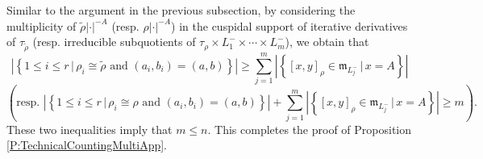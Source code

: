 \documentclass[11pt,letterpaper]{amsart}
\theoremstyle{plain}
\numberwithin{theorem}{section}
\numberwithin{equation}{subsection}
\theoremstyle{remark}
\begin{document}
\vskip 5pt
Similar to the argument in the previous subsection, by considering the multiplicity of $\widetilde{\rho}|\cdot|^{-A}$ (resp. $\rho|\cdot|^{-A}$) in the cuspidal support of iterative derivatives of $\tau_{\widetilde{\rho}}$ (resp. irreducible subquotients of $\tau_\rho\times L^-_1\times\cdots\times L^-_m$), we obtain that
\[
    \left|\left\{1\leq i\leq r\,\big|\,\rho_i\cong\widetilde{\rho} \text{ and } \left(a_i,b_i\right)=\left(a,b\right)\right\}\right|\geq \sum_{j=1}^m\left|\left\{\left[x,y\right]_\rho\in\mathfrak{m}_{L^-_j}\,\big|\,x=A\right\}\right|
\]
\[
    \left(\text{resp. } \left|\left\{1\leq i\leq r\,\big|\,\rho_i\cong{\rho} \text{ and } \left(a_i,b_i\right)=\left(a,b\right)\right\}\right|+ \sum_{j=1}^m\left|\left\{\left[x,y\right]_\rho\in\mathfrak{m}_{L^-_j}\,\big|\,x=A\right\}\right|\geq m\right).
\]
These two inequalities imply that $m\leq n$. This completes the proof of Proposition \ref{P:TechnicalCountingMultiApp}.




 
\vskip 15pt



\end{document}
